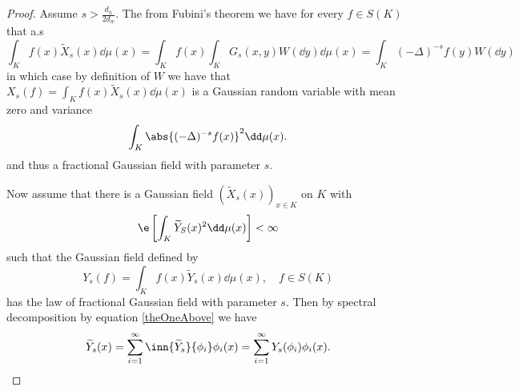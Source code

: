 \begin{proof}
	Assume $s > \frac{d_h}{2d_w}$. The from Fubini's theorem we have for every $f \in S(K)$ that a.s 
	\begin{equation}
		\int_{K}f(x)\widetilde{X}_{s}(x) \dd \mu(x) =\int_{K}f(x) \int_{K} G_s(x,y) W(\dd y) \dd \mu(x) = \int_{K}(-\Delta)^{-s} f(y) W(\dd y)
	\end{equation}
	in which case by definition of $W$ we have that $X_s(f) = \int_{K}f(x)\widetilde{X}_{s}(x) \dd \mu(x)$ is a Gaussian random variable with mean zero and variance
	\begin{equation}
		\int_{K}\abs{(-\Delta)^{-s}f(x)}^{2}\dd \mu(x).
	\end{equation}
	and thus a fractional Gaussian field with parameter $s$. 
	
	Now assume that there is a Gaussian field $\left(\widetilde{X}_{s}(x)\right)_{x \in K}$ on $K$ with
	\begin{equation}
		\e \left[\int_{K}\widetilde{Y}_S(x)^2 \dd \mu(x)\right] < \infty
	\end{equation}
	such that the Gaussian field defined by
	\begin{equation}\label{theOneAbove}
		Y_s(f) = \int_{K}f(x) \widetilde{Y}_{s}(x) \dd \mu (x), \quad f \in S(K)
	\end{equation}
	has the law of fractional Gaussian field with parameter $s$. Then by spectral decomposition by equation \ref{theOneAbove} we have
	\begin{equation}
		\widetilde{Y}_s(x) = \sum_{i= 1}^{\infty} \inn{\widetilde{Y}_{s}}{\phi_i} \phi_i(x) = \sum_{i = 1}^{\infty} Y_s(\phi_i)\phi_i(x).
	\end{equation}
	

\end{proof}
